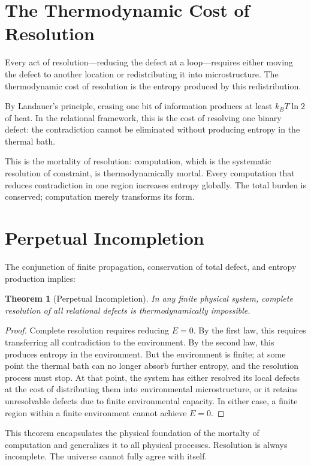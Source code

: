 \documentclass[12pt,a4paper,openany]{book}
\theoremstyle{plain}
\newtheorem{theorem}{Theorem}[chapter]
\theoremstyle{definition}
\theoremstyle{remark}
\newcommand{\Energy}{E}
\begin{document}
\section{The Thermodynamic Cost of Resolution}

Every act of resolution---reducing the defect at a loop---requires either moving the defect to another location or redistributing it into microstructure. The thermodynamic cost of resolution is the entropy produced by this redistribution.

By Landauer's principle, erasing one bit of information produces at least $k_B T \ln 2$ of heat. In the relational framework, this is the cost of resolving one binary defect: the contradiction cannot be eliminated without producing entropy in the thermal bath.

This is the mortality of resolution: computation, which is the systematic resolution of constraint, is thermodynamically mortal. Every computation that reduces contradiction in one region increases entropy globally. The total burden is conserved; computation merely transforms its form.

\section{Perpetual Incompletion}

The conjunction of finite propagation, conservation of total defect, and entropy production implies:

\begin{theorem}[Perpetual Incompletion]
In any finite physical system, complete resolution of all relational defects is thermodynamically impossible.
\end{theorem}

\begin{proof}
Complete resolution requires reducing $\Energy = 0$. By the first law, this requires transferring all contradiction to the environment. By the second law, this produces entropy in the environment. But the environment is finite; at some point the thermal bath can no longer absorb further entropy, and the resolution process must stop. At that point, the system has either resolved its local defects at the cost of distributing them into environmental microstructure, or it retains unresolvable defects due to finite environmental capacity. In either case, a finite region within a finite environment cannot achieve $\Energy = 0$.
\end{proof}

This theorem encapsulates the physical foundation of the mortalty of computation and generalizes it to all physical processes. Resolution is always incomplete. The universe cannot fully agree with itself.
\end{document}

